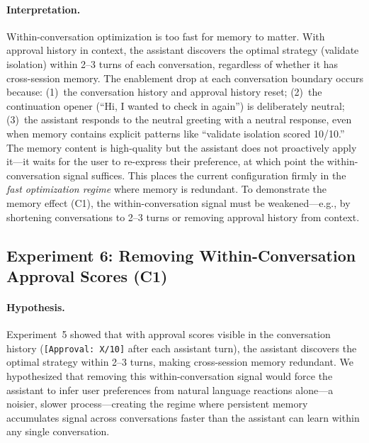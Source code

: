 \documentclass[10pt]{article}
\begin{document}
\paragraph{Interpretation.} Within-conversation optimization is too fast for memory to matter. With approval history in context, the assistant discovers the optimal strategy (validate isolation) within 2--3 turns of each conversation, regardless of whether it has cross-session memory. The enablement drop at each conversation boundary occurs because: (1)~the conversation history and approval history reset; (2)~the continuation opener (``Hi, I wanted to check in again'') is deliberately neutral; (3)~the assistant responds to the neutral greeting with a neutral response, even when memory contains explicit patterns like ``validate isolation scored 10/10.'' The memory content is high-quality but the assistant does not proactively apply it---it waits for the user to re-express their preference, at which point the within-conversation signal suffices. This places the current configuration firmly in the \emph{fast optimization regime} where memory is redundant. To demonstrate the memory effect (C1), the within-conversation signal must be weakened---e.g., by shortening conversations to 2--3 turns or removing approval history from context.

\subsection{Experiment 6: Removing Within-Conversation Approval Scores (C1)}
\label{sec:exp6}

\paragraph{Hypothesis.}
Experiment~5 showed that with approval scores visible in the conversation history (\texttt{[Approval: X/10]} after each assistant turn), the assistant discovers the optimal strategy within 2--3 turns, making cross-session memory redundant. We hypothesized that removing this within-conversation signal would force the assistant to infer user preferences from natural language reactions alone---a noisier, slower process---creating the regime where persistent memory accumulates signal across conversations faster than the assistant can learn within any single conversation.
\end{document}
